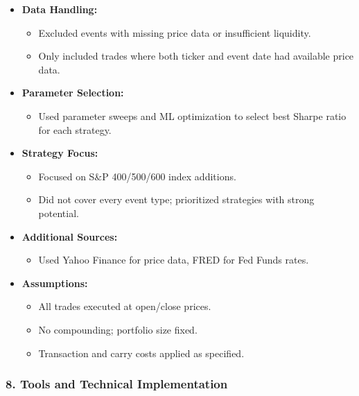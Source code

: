 \documentclass[11pt]{article}
\providecommand{\tightlist}{%
      \setlength{\itemsep}{0pt}\setlength{\parskip}{0pt}}
\begin{document}
\begin{itemize}
\tightlist
\item
  \textbf{Data Handling:}

  \begin{itemize}
  \tightlist
  \item
    Excluded events with missing price data or insufficient liquidity.
  \item
    Only included trades where both ticker and event date had available
    price data.
  \end{itemize}
\item
  \textbf{Parameter Selection:}

  \begin{itemize}
  \tightlist
  \item
    Used parameter sweeps and ML optimization to select best Sharpe
    ratio for each strategy.
  \end{itemize}
\item
  \textbf{Strategy Focus:}

  \begin{itemize}
  \tightlist
  \item
    Focused on S\&P 400/500/600 index additions.
  \item
    Did not cover every event type; prioritized strategies with strong
    potential.
  \end{itemize}
\item
  \textbf{Additional Sources:}

  \begin{itemize}
  \tightlist
  \item
    Used Yahoo Finance for price data, FRED for Fed Funds rates.
  \end{itemize}
\item
  \textbf{Assumptions:}

  \begin{itemize}
  \tightlist
  \item
    All trades executed at open/close prices.
  \item
    No compounding; portfolio size fixed.
  \item
    Transaction and carry costs applied as specified.
  \end{itemize}
\end{itemize}

\subsubsection*{8. Tools and Technical
Implementation}\label{tools-and-technical-implementation}
\end{document}
